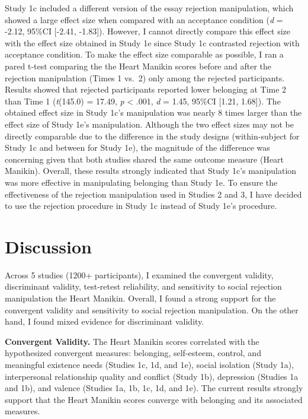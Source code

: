\documentclass[
]{udthesis}
\begin{document}
Study 1c included a different version of the essay rejection
manipulation, which showed a large effect size when compared with an
acceptance condition (\emph{d} = -2.12, 95\%CI {[}-2.41, -1.83{]}). However, I cannot
directly compare this effect size with the effect size obtained in Study
1e since Study 1c contrasted rejection with acceptance condition. To
make the effect size comparable as possible, I ran a pared t-test
comparing the the Heart Manikin scores before and after the rejection
manipulation (Times 1 vs.~2) only among the rejected participants.
Results showed that rejected participants reported lower belonging at
Time 2 than Time 1 (\emph{t}(145.0) = 17.49, \emph{p} \textless{} .001, \emph{d} = 1.45, 95\%CI {[}1.21, 1.68{]}). The
obtained effect size in Study 1c's manipulation was nearly
8
times larger than the effect size of Study 1e's manipulation. Although
the two effect sizes may not be directly comparable due to the
difference in the study designs (within-subject for Study 1c and between
for Study 1e), the magnitude of the difference was concerning given that
both studies shared the same outcome measure (Heart Manikin). Overall,
these results strongly indicated that Study 1c's manipulation was more
effective in manipulating belonging than Study 1e. To ensure the
effectiveness of the rejection manipulation used in Studies 2 and 3, I
have decided to use the rejection procedure in Study 1c instead of Study
1e's procedure.

\section{Discussion}\label{discussion}

Across 5 studies (1200+ participants), I examined the convergent validity, discriminant
validity, test-retest reliability, and
sensitivity to social rejection manipulation the Heart Manikin. Overall, I found a strong support for the convergent validity and sensitivity to social rejection manipulation. On the other hand, I found mixed evidence for discriminant validity.

\textbf{Convergent Validity.} The Heart Manikin scores correlated with the
hypothesized convergent measures: belonging, self-esteem, control, and
meaningful existence needs (Studies 1c, 1d, and 1e), social isolation
(Study 1a), interpersonal relationship quality and conflict (Study 1b),
depression (Studies 1a and 1b), and valence (Studies 1a, 1b, 1c, 1d, and
1e). The current results strongly support that the Heart Manikin scores
converge with belonging and its associated measures.
\end{document}
